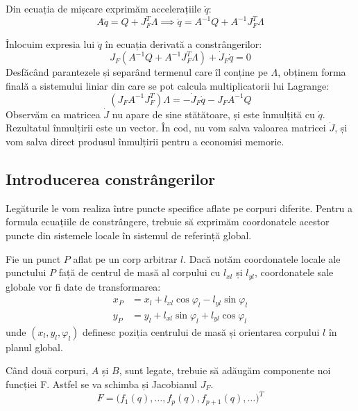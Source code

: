 \documentclass[12pt, a4paper]{article}
\begin{document}
Din ecuația de mișcare exprimăm accelerațiile $\ddot{q}$:
\begin{equation}
    A\ddot{q} = Q + J_F^T \Lambda \implies \ddot{q} = A^{-1}Q + A^{-1}J_F^T \Lambda
\end{equation}

Înlocuim expresia lui $\ddot{q}$ în ecuația derivată a constrângerilor:
\begin{equation}
    J_F (A^{-1}Q + A^{-1}J_F^T \Lambda) + \dot{J}_F \dot{q} = 0
\end{equation}
Desfăcând parantezele și separând termenul care îl conține pe $\Lambda$, obținem forma finală a sistemului liniar din care se pot calcula multiplicatorii lui Lagrange:
\begin{equation}
    (J_F A^{-1} J_F^T)\Lambda = -\dot{J}_F \dot{q} - J_F A^{-1} Q
\end{equation}
Observăm ca matricea $\dot{J}$ nu apare de sine stătătoare, și este înmulțită cu $\dot{q}$. Rezultatul înmulțirii este un vector. În cod, nu vom salva valoarea matricei $\dot{J}$, și vom salva direct produsul înmulțirii pentru a economisi memorie.

\subsection{Introducerea constrângerilor}

Legăturile le vom realiza între puncte specifice aflate pe corpuri diferite. Pentru a formula ecuațiile de constrângere, trebuie să exprimăm coordonatele acestor puncte din sistemele locale în sistemul de referință global.

Fie un punct $P$ aflat pe un corp arbitrar $l$. Dacă notăm coordonatele locale ale punctului $P$ față de centrul de masă al corpului cu $l_{xl}$ și $l_{yl}$, coordonatele sale globale vor fi date de transformarea:
\begin{equation}
    \begin{aligned}
        x_P &= x_l + l_{xl}\cos\varphi_l - l_{yl}\sin\varphi_l \\
        y_P &= y_l + l_{xl}\sin\varphi_l + l_{yl}\cos\varphi_l
    \end{aligned}
\end{equation}
unde $(x_l, y_l, \varphi_l)$ definesc poziția centrului de masă și orientarea corpului $l$ în planul global.

Când două corpuri, $A$ și $B$, sunt legate, trebuie să adăugăm componente noi funcției F. Astfel se va schimba și Jacobianul $J_F$.
\begin{equation}
    F = \big( f_1(q), \dots, f_p(q), f_{p+1}(q), \dots \big)^T
\end{equation}
\end{document}
